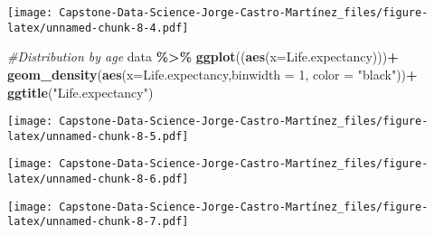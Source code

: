 \documentclass[
]{article}
\newenvironment{Shaded}{\begin{snugshade}}{\end{snugshade}}
\newcommand{\AttributeTok}[1]{\textcolor[rgb]{0.13,0.29,0.53}{#1}}
\newcommand{\CommentTok}[1]{\textcolor[rgb]{0.56,0.35,0.01}{\textit{#1}}}
\newcommand{\DecValTok}[1]{\textcolor[rgb]{0.00,0.00,0.81}{#1}}
\newcommand{\FunctionTok}[1]{\textcolor[rgb]{0.13,0.29,0.53}{\textbf{#1}}}
\newcommand{\NormalTok}[1]{#1}
\newcommand{\SpecialCharTok}[1]{\textcolor[rgb]{0.81,0.36,0.00}{\textbf{#1}}}
\newcommand{\StringTok}[1]{\textcolor[rgb]{0.31,0.60,0.02}{#1}}
\begin{document}
\texttt{[image: Capstone-Data-Science-Jorge-Castro-Martínez\_files/figure-latex/unnamed-chunk-8-4.pdf]}

\begin{Shaded}
\begin{Highlighting}[]
\CommentTok{\#Distribution by age}
\NormalTok{data }\SpecialCharTok{\%\textgreater{}\%} \FunctionTok{ggplot}\NormalTok{((}\FunctionTok{aes}\NormalTok{(}\AttributeTok{x=}\NormalTok{Life.expectancy)))}\SpecialCharTok{+}
  \FunctionTok{geom\_density}\NormalTok{(}\FunctionTok{aes}\NormalTok{(}\AttributeTok{x=}\NormalTok{Life.expectancy,}\AttributeTok{binwidth =} \DecValTok{1}\NormalTok{, }\AttributeTok{color =} \StringTok{"black"}\NormalTok{))}\SpecialCharTok{+}
  \FunctionTok{ggtitle}\NormalTok{(}\StringTok{"Life.expectancy"}\NormalTok{)}
\end{Highlighting}
\end{Shaded}

\texttt{[image: Capstone-Data-Science-Jorge-Castro-Martínez\_files/figure-latex/unnamed-chunk-8-5.pdf]}

\begin{Shaded}
\end{Shaded}

\texttt{[image: Capstone-Data-Science-Jorge-Castro-Martínez\_files/figure-latex/unnamed-chunk-8-6.pdf]}

\begin{Shaded}
\end{Shaded}

\texttt{[image: Capstone-Data-Science-Jorge-Castro-Martínez\_files/figure-latex/unnamed-chunk-8-7.pdf]}

\begin{Shaded}
\end{Shaded}
\end{document}
